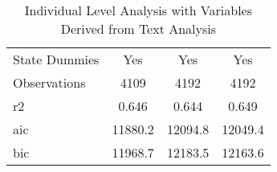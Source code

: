 \begin{table}[]
\begin{tabular}{@{}lccc@{}}
State Dummies                                            & Yes        & Yes        & Yes  \\                                                             
Observations                                             & 4109       & 4192       & 4192       \\
r2                                                       & 0.646      & 0.644      & 0.649      \\
aic                                                      & 11880.2    & 12094.8    & 12049.4    \\
bic                                                      & 11968.7    & 12183.5    & 12163.6    \\ \bottomrule
\end{tabular}
\caption{Individual Level Analysis with Variables Derived from Text Analysis}
\label{reg_ind_withtext}
\end{table}